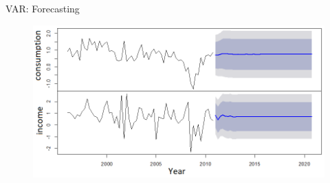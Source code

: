 \documentclass[usenames,dvipsnames]{beamer}
\begin{document}
\begin{frame}{VAR: Forecasting}
\begin{minipage}[s]{.49\textwidth}
\begin{figure}
\includegraphics[width=1.4\textwidth]{./img/P10_Obrazek_2}\\
\end{figure}
\end{minipage}
\end{frame}
\end{document}
